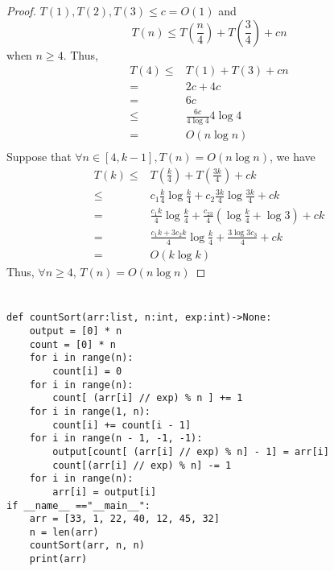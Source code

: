 \documentclass{article}
\begin{document}
    \section{}
    \begin{proof}
        $T(1),T(2), T(3)\leq c=O(1)$ and 
        \begin{equation}
            T(n)\leq T(\frac{n}{4})+T(\frac{3}{4})+cn
        \end{equation}
        when $n\geq 4$. Thus,
        \begin{equation}
            \begin{split}
                T(4)\leq &T(1)+T(3)+cn\\
                    =&2c+4c\\
                    =&6c\\
                    \leq& \frac{6c}{4\log 4} 4 \log 4\\
                    =&O(n\log n)\\
            \end{split}
        \end{equation}
        Suppose that $\forall n\in [4,k-1],T(n)=O(n\log n)$, we have
        \begin{equation}
            \begin{split}
                T(k)\leq&T(\frac{k}{4})+T(\frac{3k}{4})+ck\\
                    \leq&c_1\frac{k}{4}\log \frac{k}{4}+c_2\frac{3k}{4}\log \frac{3k}{4}+ck\\
                    =&\frac{c_1k}{4}\log\frac{k}{4}+\frac{c_23}{4}(\log\frac{k}{4}+\log3)+ck\\
                    =&\frac{c_1k+3c_2k}{4}\log\frac{k}{4}+\frac{3\log 3c_3}{4}+ck\\
                    =&O(k\log k)
            \end{split}
        \end{equation}
        Thus, $\forall n\geq 4$, $T(n)=O(n\log n)$
    \end{proof}
    \section{}
    \begin{lstlisting}
def countSort(arr:list, n:int, exp:int)->None:
    output = [0] * n 
    count = [0] * n
    for i in range(n):
        count[i] = 0
    for i in range(n):
        count[ (arr[i] // exp) % n ] += 1
    for i in range(1, n):
        count[i] += count[i - 1]
    for i in range(n - 1, -1, -1):
        output[count[ (arr[i] // exp) % n] - 1] = arr[i]
        count[(arr[i] // exp) % n] -= 1
    for i in range(n):
        arr[i] = output[i]   
if __name__ =="__main__":
    arr = [33, 1, 22, 40, 12, 45, 32]
    n = len(arr)
    countSort(arr, n, n)
    print(arr)
    \end{lstlisting}
\end{document}
